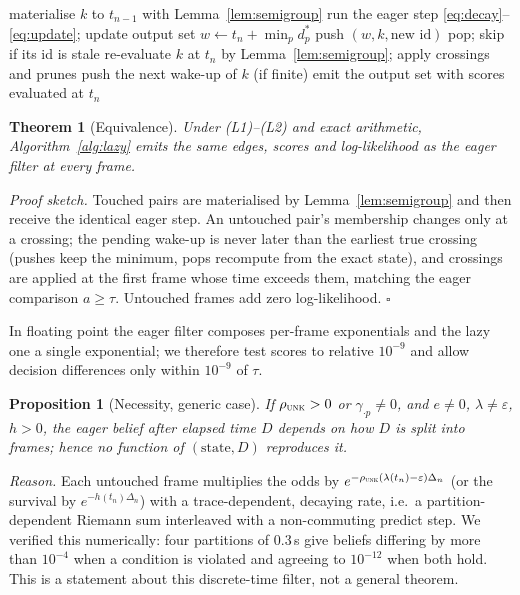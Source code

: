 \documentclass[conference]{IEEEtran}
\newtheorem{proposition}{Proposition}
\newtheorem{theorem}{Theorem}
\newcommand{\UNK}{\textsc{unk}}
\begin{document}
\begin{algorithm}[t]
\caption{Lazy V-HPED frame step (exact under L1, L2)}
\label{alg:lazy}
\begin{algorithmic}[1]
  \State materialise $k$ to $t_{n-1}$ with Lemma~\ref{lem:semigroup}
  \State run the eager step \eqref{eq:decay}--\eqref{eq:update}; update output set
  \State $w\gets t_n+\min_p d^\ast_p$ 
   push $(w,k,\text{new id})$ \EndIf
\EndFor
{}
  \State pop; skip if its id is stale
  \State re-evaluate $k$ at $t_n$ by Lemma~\ref{lem:semigroup}; apply crossings and prunes
  \State push the next wake-up of $k$ (if finite)
\EndWhile
\State emit the output set with scores evaluated at $t_n$
\end{algorithmic}
\end{algorithm}

\begin{theorem}[Equivalence]\label{thm:equiv}
Under (L1)--(L2) and exact arithmetic, Algorithm~\ref{alg:lazy} emits the same edges,
scores and log-likelihood as the eager filter at every frame.
\end{theorem}
\emph{Proof sketch.} Touched pairs are materialised by Lemma~\ref{lem:semigroup} and then
receive the identical eager step. An untouched pair's membership changes only at a
crossing; the pending wake-up is never later than the earliest true crossing (pushes
keep the minimum, pops recompute from the exact state), and crossings are applied at
the first frame whose time exceeds them, matching the eager comparison $a\ge\tau$.
Untouched frames add zero log-likelihood. \hfill$\square$

In floating point the eager filter composes per-frame exponentials and the lazy one a
single exponential; we therefore test scores to relative $10^{-9}$ and allow decision
differences only within $10^{-9}$ of $\tau$.

\begin{proposition}[Necessity, generic case]\label{prop:necessity}
If $\rho_{\UNK}>0$ or $\gamma_{\cdot p}\neq0$, and $e\neq0$, $\lambda\neq\varepsilon$,
$h>0$, the eager belief after elapsed time $D$ depends on how $D$ is split into frames;
hence no function of $(\text{state},D)$ reproduces it.
\end{proposition}
\emph{Reason.} Each untouched frame multiplies the odds by
$e^{-\rho_{\UNK}(\lambda(t_n)-\varepsilon)\Delta_n}$ (or the survival by
$e^{-h(t_n)\Delta_n}$) with a trace-dependent, decaying rate, i.e.\ a partition-dependent
Riemann sum interleaved with a non-commuting predict step. We verified this numerically:
four partitions of $0.3$\,s give beliefs differing by more than $10^{-4}$ when a condition
is violated and agreeing to $10^{-12}$ when both hold. This is a statement about this
discrete-time filter, not a general theorem.
\end{document}

